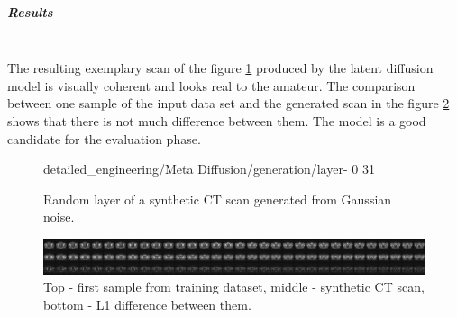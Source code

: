 \subparagraph{Results}\mbox{}\\
\indent The resulting exemplary scan of the figure \ref{fig:random_ldm} produced by the latent diffusion model is visually coherent and looks real to the amateur. The comparison between one sample of the input data set and the generated scan in the figure \ref{fig:ldm-success-comparison} shows that there is not much difference between them. The model is a good candidate for the evaluation phase.

\begin{figure}[H]
    \centering
    {detailed_engineering/Meta Diffusion/generation/layer-}%
    {0}%
    {31}%
    \caption{Random layer of a synthetic CT scan generated from Gaussian noise.}
    \label{fig:random_ldm}
\end{figure}

\begin{figure}[H]
    \centering
    \includegraphics[width=\linewidth]{detailed_engineering/Meta Diffusion/charts/meta_diffusion_comparison.png}
    \caption{Top - first sample from training dataset, middle - synthetic CT scan, bottom - L1 difference between them.}
    \label{fig:ldm-success-comparison}
\end{figure}